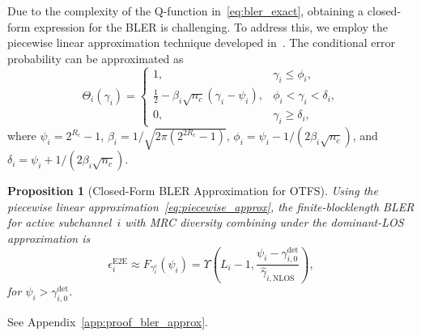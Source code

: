 \documentclass[journal]{IEEEtran}
\newtheorem{proposition}{Proposition}
\begin{document}
Due to the complexity of the Q-function in~\eqref{eq:bler_exact}, obtaining a closed-form expression for the BLER is challenging. To address this, we employ the piecewise linear approximation technique developed in~\cite{Makki2014,Basnayaka2022}. The conditional error probability can be approximated as
\begin{equation}
\Theta_i(\gamma_i) =
\begin{cases}
1, & \gamma_i \leq \phi_i, \\
\frac{1}{2} - \beta_i \sqrt{n_c}(\gamma_i - \psi_i), & \phi_i < \gamma_i < \delta_i, \\
0, & \gamma_i \geq \delta_i,
\end{cases}
\label{eq:piecewise_approx}
\end{equation}
where $\psi_i = 2^{R_c} - 1$, $\beta_i = {1}/{\sqrt{2\pi(2^{2R_c} - 1)}}$, $\phi_i = \psi_i - {1}/{(2\beta_i \sqrt{n_c})}$, and $\delta_i = \psi_i + {1}/{(2\beta_i \sqrt{n_c})}$.
\begin{proposition}[Closed-Form BLER Approximation for OTFS]
\label{prop:bler_approx}
Using the piecewise linear approximation~\eqref{eq:piecewise_approx}, the finite-blocklength BLER for active subchannel~$i$ with MRC diversity combining under the dominant-LOS approximation is
\begin{equation}
\epsilon_i^{\mathrm{E2E}} \approx F_{\gamma_i^{\mathrm{c}}}(\psi_i) = \Upsilon\left(L_i-1, \frac{\psi_i - \gamma_{i,0}^{\mathrm{det}}}{\hat{\gamma}_{i,\mathrm{NLOS}}}\right),
\label{eq:bler_cdf_combined}
\end{equation}
for $\psi_i > \gamma_{i,0}^{\mathrm{det}}$.
\end{proposition}

\begin{IEEEproof}
See Appendix~\ref{app:proof_bler_approx}.
\end{IEEEproof}
\end{document}
